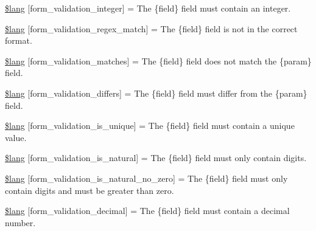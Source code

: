 \begin{DoxyCompactItemize}
\item 
\mbox{\hyperlink{form__validation__lang_8php_a9a483842a44c5006ad4c6eb9cff5d0da}{\$lang}} \mbox{[}\textquotesingle{}form\+\_\+validation\+\_\+integer\textquotesingle{}\mbox{]} = \textquotesingle{}The \{field\} field must contain an integer.\textquotesingle{}
\item 
\mbox{\hyperlink{form__validation__lang_8php_a4cc64a1c2fdcf7b8592eb210a6108a9d}{\$lang}} \mbox{[}\textquotesingle{}form\+\_\+validation\+\_\+regex\+\_\+match\textquotesingle{}\mbox{]} = \textquotesingle{}The \{field\} field is not in the correct format.\textquotesingle{}
\item 
\mbox{\hyperlink{form__validation__lang_8php_a843e30483d89e94eb326b34886aeb13d}{\$lang}} \mbox{[}\textquotesingle{}form\+\_\+validation\+\_\+matches\textquotesingle{}\mbox{]} = \textquotesingle{}The \{field\} field does not match the \{param\} field.\textquotesingle{}
\item 
\mbox{\hyperlink{form__validation__lang_8php_a196b3cce6424faf96214ef20e682b2b3}{\$lang}} \mbox{[}\textquotesingle{}form\+\_\+validation\+\_\+differs\textquotesingle{}\mbox{]} = \textquotesingle{}The \{field\} field must differ from the \{param\} field.\textquotesingle{}
\item 
\mbox{\hyperlink{form__validation__lang_8php_a4e16c6146baf3a668fa62bec7cd88398}{\$lang}} \mbox{[}\textquotesingle{}form\+\_\+validation\+\_\+is\+\_\+unique\textquotesingle{}\mbox{]} = \textquotesingle{}The \{field\} field must contain a unique value.\textquotesingle{}
\item 
\mbox{\hyperlink{form__validation__lang_8php_a2c3eddbfb5737ab66d6bc5d5be03ad67}{\$lang}} \mbox{[}\textquotesingle{}form\+\_\+validation\+\_\+is\+\_\+natural\textquotesingle{}\mbox{]} = \textquotesingle{}The \{field\} field must only contain digits.\textquotesingle{}
\item 
\mbox{\hyperlink{form__validation__lang_8php_ae46b693670134065670a56a342f15d3a}{\$lang}} \mbox{[}\textquotesingle{}form\+\_\+validation\+\_\+is\+\_\+natural\+\_\+no\+\_\+zero\textquotesingle{}\mbox{]} = \textquotesingle{}The \{field\} field must only contain digits and must be greater than zero.\textquotesingle{}
\item 
\mbox{\hyperlink{form__validation__lang_8php_a62357354ca5d258d41178ee441391cbc}{\$lang}} \mbox{[}\textquotesingle{}form\+\_\+validation\+\_\+decimal\textquotesingle{}\mbox{]} = \textquotesingle{}The \{field\} field must contain a decimal number.\textquotesingle{}
\item 

\end{DoxyCompactItemize}
